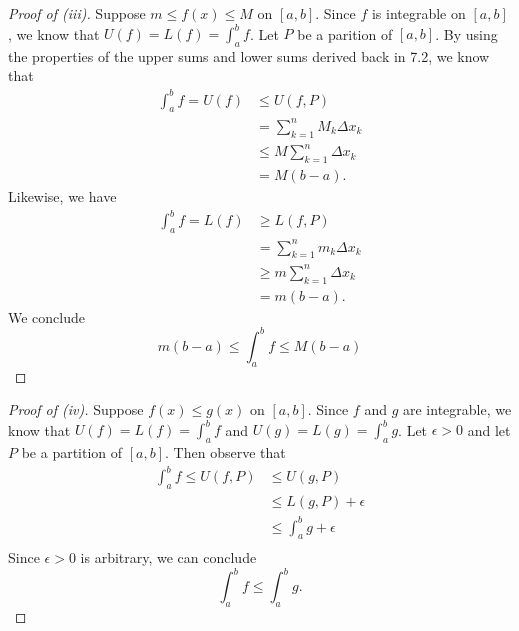 \begin{proof}[Proof of (iii)]
	Suppose \( m \leq f(x) \leq M  \) on \( [a,b]  \). Since \( f  \) is integrable on \( [a,b]  \), we know that \( U(f) = L(f) = \int_{ a }^{ b } f  \). Let \( P  \) be a parition of \( [a,b] \). By using the properties of the upper sums and lower sums derived back in 7.2, we know that 
	\begin{align*}
	    \int_{ a }^{ b } f = U(f) &\leq U(f,P) \\
			 &= \sum_{ k=1 }^{ n } M_{k } \Delta x_{k } \\
			 &\leq M \sum_{ k=1 }^{ n } \Delta x_{k } \\ 
			 &= M(b-a).
	\end{align*}
	Likewise, we have 
	\begin{align*}
	    \int_{ a }^{ b } f = L(f) &\geq L(f, P) \\
								  &= \sum_{ k=1 }^{ n } m_{k } \Delta x_{k } \\ 
								  &\geq m \sum_{ k=1 }^{ n } \Delta x_{k } \\
								  &= m (b-a).
	\end{align*}
	We conclude 
	\[  m(b-a) \leq \int_{ a }^{ b } f \leq M(b-a) \]
\end{proof}


\begin{proof}[Proof of (iv)]
	Suppose \( f(x) \leq g(x) \) on \( [a,b]  \). Since \( f  \) and \( g \) are integrable, we know that \( U(f) = L(f) = \int_{ a }^{ b } f  \) and \( U(g) = L(g) = \int_{ a }^{ b } g  \). Let \( \epsilon > 0  \) and let \( P  \) be a partition of \( [a,b] \). Then observe that 
	\begin{align*}
		\int_{ a }^{ b } f \leq U(f,P) &\leq U(g, P) \\
									 &\leq L(g,P) + \epsilon \\ 
									 &\leq \int_{ a }^{ b } g  + \epsilon \\
	\end{align*}
	Since \( \epsilon > 0 \) is arbitrary, we can conclude 
	\[  \int_{ a }^{ b } f \leq \int_{ a }^{ b } g. \]
\end{proof}






